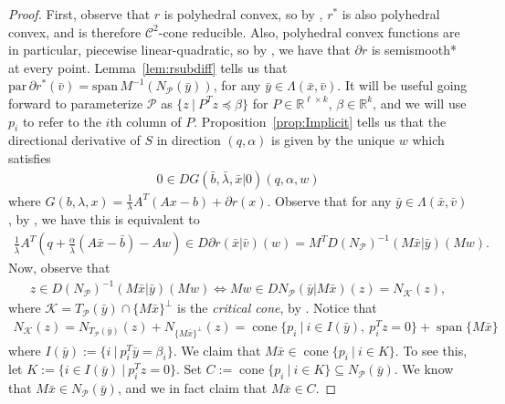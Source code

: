 \documentclass[reqno]{amsart}
\numberwithin{equation}{section}
\newcommand{\R}{\mathbb{R}}
\newcommand{\pol}{\mathcal{P}}
\newcommand{\x}{\bar{x}}
\newcommand{\para}{\mathrm{par}\,}
\newcommand{\lin}{\mathrm{span}\,}
\begin{document}
\begin{proof} First, observe that 
    $r$ is polyhedral convex, so by \cite[Theorem 11.14]{RoW 98}, $r^*$ is also polyhedral convex, and is therefore $\mathcal{C}^2$-cone reducible.
    Also, polyhedral convex functions are in particular, piecewise linear-quadratic, so by \cite[Proposition 3]{FGH 22}, we have that $\partial r$ is semismooth* at every point.
    Lemma~\ref{lem:rsubdiff} tells us that $\para \partial r^*(\bar v) = \lin M^{-1} (N_{\pol} (\bar{y}))$, for any $\bar y \in \Lambda(\x, \bar v)$.
    It will be useful going forward to parameterize $\pol$ as $\{z \ | \ P^Tz \preceq \beta\}$ for $P \in \R^{\ell \times k}$, $\beta \in \R^{k}$, and
    we will use $p_i$ to refer to the $i$th column of $P$.
    Proposition~\ref{prop:Implicit} tells us that the directional derivative of $S$ in direction $(q, \alpha)$
    is given by the unique $w$ which satisfies \begin{align*}
        0 \in DG(\bar{b}, \bar{\lambda}, \x | 0)(q, \alpha, w)
    \end{align*} where $G(b, \lambda, x) = \frac{1}{\lambda} A^T(Ax - b) + \partial r(x)$.
    Observe that for any $\bar{y} \in \Lambda (\x, \bar{v})$, by \cite[Theorem 7.2]{MMS 22}, we have this is equivalent to \begin{align*}
        \frac{1}{\bar{\lambda}} A^T \left(q + \frac{\alpha}{\bar{\lambda}} (A \x - \bar{b}) - Aw\right)
        \in D \partial r (\bar{x} | \bar{v})(w) = M^T D(N_{\pol})^{-1}(M \x | \bar{y})(Mw).
    \end{align*}
    Now, observe that \begin{align*}
        z \in D(N_{\pol})^{-1}(M \x | \bar{y})(Mw) \iff Mw \in D N_{\pol} (\bar{y} | M \x)(z) = N_{\mathcal{K}}(z),
    \end{align*} 
    where $\mathcal{K} = T_{\pol}(\bar{y}) \cap \{M \x\}^{\bot}$ is the {\em critical cone}, by \cite[Example 13.44]{RoW 98}.
    Notice that \begin{align*}
        N_{\mathcal{K}}(z) = N_{T_{\pol}(\bar{y})}(z) + N_{\{M \x\}^{\bot}}(z) = 
        \operatorname{cone} \{p_i \ | \ i \in I(\bar{y}), \ p_i^Tz = 0\} + \operatorname{span}\{M \x\}
    \end{align*} where $I(\bar{y}) := \{i \ | \ p_i^T \bar{y} = \beta_i\}$.
    We claim that $M\x \in \operatorname{cone} \{p_i \ | \ i \in K\}$. To see this, let $K := \{i \in I(\bar{y}) \ | \ p_i^Tz = 0\}$. Set $C := \operatorname{cone} \{p_i \ | \ i \in K\} \subseteq N_{\pol}(\bar{y})$.
    We know that $M \x \in N_{\pol}(\bar{y})$, and we in fact claim that $M \x \in C$. 

\end{proof}
\end{document}

